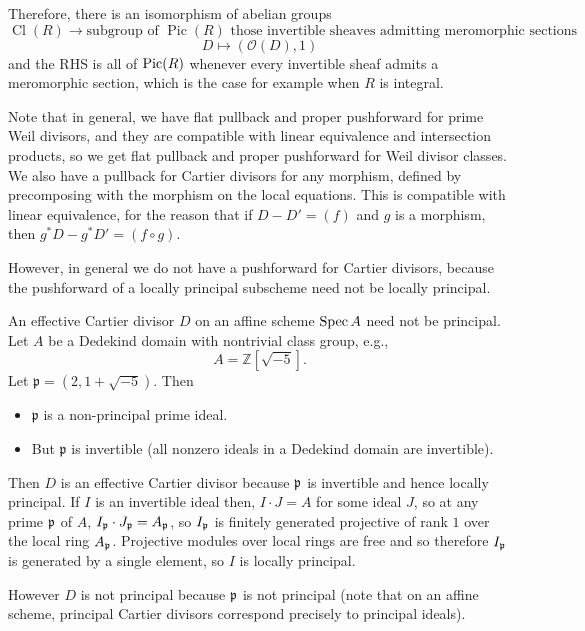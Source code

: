 \documentclass[12pt]{article}
\begin{document}
Therefore, there is an isomorphism of abelian groups
\[
    \operatorname{Cl}(R) \to \text{subgroup of } \operatorname{Pic}(R) \text{ those invertible sheaves admitting meromorphic sections}
\]
\[
    D \mapsto (\mathcal O(D), 1)
\]
and the RHS is all of $\operatorname{Pic}(R)$ whenever every invertible sheaf admits a meromorphic section, which is the case for example when \(R\) is integral.

\begin{remark}
    Note that in general, we have flat pullback and proper pushforward for prime Weil divisors, and they are compatible with linear equivalence and intersection products, so we get flat pullback and proper pushforward for Weil divisor classes. We also have a pullback for Cartier divisors for any morphism, defined by precomposing with the morphism on the local equations. This is compatible with linear equivalence, for the reason that if $D - D' = (f)$ and $g$ is a morphism, then $g^*D - g^*D' = (f \circ g)$.

    However, in general we do not have a pushforward for Cartier divisors, because the pushforward of a locally principal subscheme need not be locally principal.
\end{remark}

\begin{example}
    An effective Cartier divisor $D$ on an affine scheme $\operatorname{Spec} A$ need not be principal. Let $A$ be a Dedekind domain with nontrivial class group, e.g.,
    \[
        A = \mathbb{Z}[\sqrt{-5}].
    \]
    Let $\mathfrak{p} = (2, 1+\sqrt{-5})$. Then
    \begin{itemize}
        \item $\mathfrak{p}$ is a non-principal prime ideal.
        \item But $\mathfrak{p}$ is invertible (all nonzero ideals in a Dedekind domain are invertible).
    \end{itemize}
    Then $D$ is an effective Cartier divisor because $\mathfrak{p}$ is invertible and hence locally principal. If $I$ is an invertible ideal then, $I \cdot J = A$ for some ideal $J$, so at any prime $\mathfrak{p}$ of $A$, $I_{\mathfrak{p}} \cdot J_{\mathfrak{p}} = A_{\mathfrak{p}}$, so $I_{\mathfrak{p}}$ is finitely generated projective of rank $1$ over the local ring $A_{\mathfrak{p}}$. Projective modules over local rings are free and so therefore $I_{\mathfrak{p}}$ is generated by a single element, so $I$ is locally principal.

    However $D$ is not principal because $\mathfrak{p}$ is not principal (note that on an affine scheme, principal Cartier divisors correspond precisely to principal ideals).
\end{example}
\end{document}
